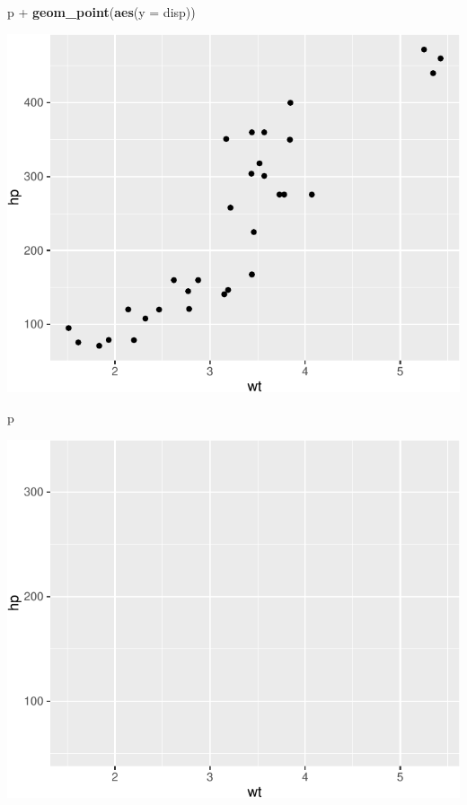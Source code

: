 \documentclass[]{article}
\newenvironment{Shaded}{\begin{snugshade}}{\end{snugshade}}
\newcommand{\KeywordTok}[1]{\textcolor[rgb]{0.13,0.29,0.53}{\textbf{{#1}}}}
\newcommand{\DataTypeTok}[1]{\textcolor[rgb]{0.13,0.29,0.53}{{#1}}}
\newcommand{\StringTok}[1]{\textcolor[rgb]{0.31,0.60,0.02}{{#1}}}
\newcommand{\NormalTok}[1]{{#1}}
\numberwithin{equation}{section}
\begin{document}
\begin{Shaded}
\begin{Highlighting}[]
\NormalTok{p +}\StringTok{ }\KeywordTok{geom_point}\NormalTok{(}\KeywordTok{aes}\NormalTok{(}\DataTypeTok{y =} \NormalTok{disp))}
\end{Highlighting}
\end{Shaded}

\includegraphics{index_files/figure-latex/unnamed-chunk-235-10.pdf}

\begin{Shaded}
\begin{Highlighting}[]
\NormalTok{p}
\end{Highlighting}
\end{Shaded}

\includegraphics{index_files/figure-latex/unnamed-chunk-235-11.pdf}
\end{document}
